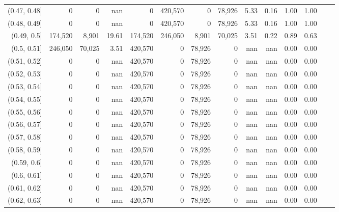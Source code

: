 \begin{tabular}{rrrrrrrrrrrrrr}
(0.47, 0.48]   &        0 &       0 &    nan &        0 &  420,570 &       0 &  78,926 &  5.33 &  0.16 &  1.00 &      1.00 \\
(0.48, 0.49]   &        0 &       0 &    nan &        0 &  420,570 &       0 &  78,926 &  5.33 &  0.16 &  1.00 &      1.00 \\
(0.49, 0.5]    &  174,520 &   8,901 &  19.61 &  174,520 &  246,050 &   8,901 &  70,025 &  3.51 &  0.22 &  0.89 &      0.63 \\
(0.5, 0.51]    &  246,050 &  70,025 &   3.51 &  420,570 &        0 &  78,926 &       0 &   nan &   nan &  0.00 &      0.00 \\
(0.51, 0.52]   &        0 &       0 &    nan &  420,570 &        0 &  78,926 &       0 &   nan &   nan &  0.00 &      0.00 \\
(0.52, 0.53]   &        0 &       0 &    nan &  420,570 &        0 &  78,926 &       0 &   nan &   nan &  0.00 &      0.00 \\
(0.53, 0.54]   &        0 &       0 &    nan &  420,570 &        0 &  78,926 &       0 &   nan &   nan &  0.00 &      0.00 \\
(0.54, 0.55]   &        0 &       0 &    nan &  420,570 &        0 &  78,926 &       0 &   nan &   nan &  0.00 &      0.00 \\
(0.55, 0.56]   &        0 &       0 &    nan &  420,570 &        0 &  78,926 &       0 &   nan &   nan &  0.00 &      0.00 \\
(0.56, 0.57]   &        0 &       0 &    nan &  420,570 &        0 &  78,926 &       0 &   nan &   nan &  0.00 &      0.00 \\
(0.57, 0.58]   &        0 &       0 &    nan &  420,570 &        0 &  78,926 &       0 &   nan &   nan &  0.00 &      0.00 \\
(0.58, 0.59]   &        0 &       0 &    nan &  420,570 &        0 &  78,926 &       0 &   nan &   nan &  0.00 &      0.00 \\
(0.59, 0.6]    &        0 &       0 &    nan &  420,570 &        0 &  78,926 &       0 &   nan &   nan &  0.00 &      0.00 \\
(0.6, 0.61]    &        0 &       0 &    nan &  420,570 &        0 &  78,926 &       0 &   nan &   nan &  0.00 &      0.00 \\
(0.61, 0.62]   &        0 &       0 &    nan &  420,570 &        0 &  78,926 &       0 &   nan &   nan &  0.00 &      0.00 \\
(0.62, 0.63]   &        0 &       0 &    nan &  420,570 &        0 &  78,926 &       0 &   nan &   nan &  0.00 &      0.00 \\

\end{tabular}
